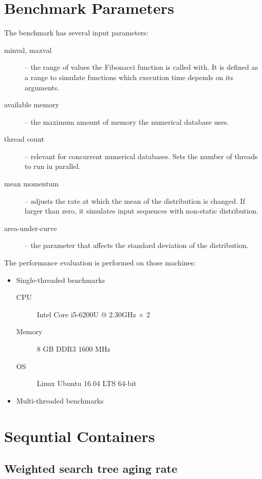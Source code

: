 \section{Benchmark Parameters}
The benchmark has several input parameters:
\begin{description}
\item [minval, maxval]-- the range of values the Fibonacci function is called with. It is defined as a range to simulate functions which execution time depends on its arguments.
\item [available memory]-- the maximum amount of memory the numerical database uses.
\item [thread count]-- relevant for concurrent numerical databases. Sets the number of  threads to run in parallel.
\item[mean momentum]-- adjusts the rate at which the mean of the distribution is changed. If larger than zero, it simulates input sequences with non-static distribution.
\item[area-under-curve]-- the parameter that affects the standard deviation of the distribution.
\end{description}

The performance evaluation is performed on those machines:
\begin{itemize}
\item Single-threaded benchmarks
\begin{description}
\item [CPU] Intel\textsuperscript{\textregistered{}} Core\textsuperscript{\texttrademark{}} i5-6200U @ 2.30GHz $ \times $ 2
\item [Memory] 8 GB DDR3 1600 MHz
\item [OS] Linux\textsuperscript{\textregistered{}} Ubuntu\textsuperscript{\textregistered{}} 16.04 LTS 64-bit
\end{description}
\item Multi-threaded benchmarks

\end{itemize}


\section{Sequntial Containers}
\label{sec:seqbench}

\subsection{Weighted search tree aging rate}


